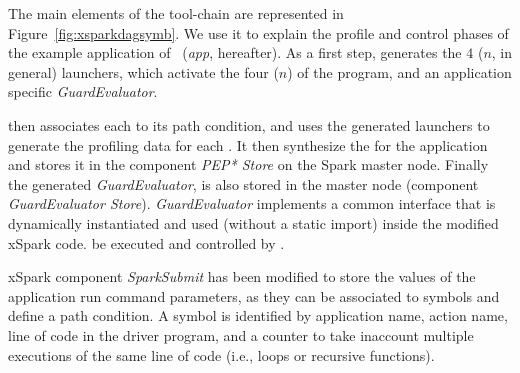 The main elements of the tool-chain are represented in Figure~\ref{fig:xsparkdagsymb}. We use it to explain the profile and control phases of the example application of~ (\textit{app}, hereafter). As a first step, \dSymb generates the $4$ ($n$, in general) launchers, which activate the four ($n$) \plans of the program, and an application specific \textit{GuardEvaluator}. 

\tool then associates each \plan to its path condition, and uses the generated launchers to generate the profiling data for each \plan. It then synthesize the \model for the application and stores it in the component \textit{PEP* Store} on the Spark master node. Finally the generated \textit{GuardEvaluator}, is also stored in the master node (component \textit{GuardEvaluator Store}). \textit{GuardEvaluator} implements a common interface that is dynamically instantiated and used (without a static import) inside the modified xSpark code. be executed and controlled by \cSpark. 




xSpark component \textit{SparkSubmit} has been modified to store the values of the application run command parameters, as they can be associated to symbols and define a path condition. A symbol is identified by application name, action name, line of code in the driver program, and a counter to take inaccount multiple executions of the same line of code  (i.e., loops or recursive functions). 

